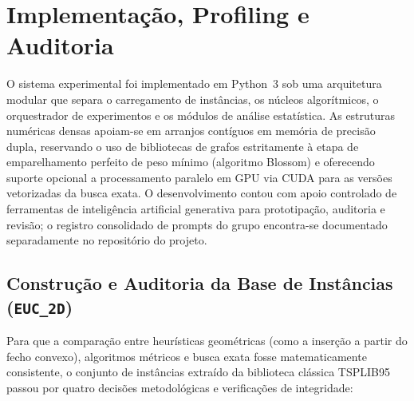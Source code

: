 \section{Implementação, Profiling e Auditoria}
\label{sec:implementacao}

O sistema experimental foi implementado em Python~3 sob uma arquitetura modular que separa o
carregamento de instâncias, os núcleos algorítmicos, o orquestrador de experimentos e os
módulos de análise estatística. As estruturas numéricas densas apoiam-se em arranjos contíguos
em memória de precisão dupla, reservando o uso de bibliotecas de grafos estritamente à etapa de
emparelhamento perfeito de peso mínimo (algoritmo Blossom) e oferecendo suporte opcional a
processamento paralelo em GPU via CUDA para as versões vetorizadas da busca exata. O
desenvolvimento contou com apoio controlado de ferramentas de inteligência artificial generativa
para prototipação, auditoria e revisão; o registro consolidado de prompts do grupo encontra-se
documentado separadamente no repositório do projeto.

\subsection{Construção e Auditoria da Base de Instâncias (\texttt{EUC\_2D})}
\label{sec:base_dados}

Para que a comparação entre heurísticas geométricas (como a inserção a partir do fecho convexo),
algoritmos métricos e busca exata fosse matematicamente consistente, o conjunto de instâncias
extraído da biblioteca clássica TSPLIB95 \cite{reinelt1991tsplib} passou por quatro decisões
metodológicas e verificações de integridade:

